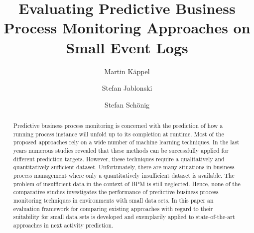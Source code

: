 \documentclass[runningheads]{llncs}
\begin{document}
%
\title{Evaluating Predictive Business Process Monitoring Approaches on Small Event Logs}
%
%
\author{Martin Käppel \and Stefan Jablonski
\and Stefan Schönig}

%
%
\maketitle              %
%
\vspace{-18pt}
\begin{abstract}
Predictive business process monitoring is concerned with the prediction of how a running process instance will unfold up to its completion at runtime. Most of the proposed approaches rely on a wide number of machine learning techniques. In the last years numerous studies revealed that these methods can be successfully applied for different prediction targets. However, these techniques require a qualitatively and quantitatively sufficient dataset. Unfortunately, there are many situations in business process management where only a quantitatively insufficient dataset is available. The problem of insufficient data in the context of BPM is still neglected. Hence, none of the comparative studies investigates the performance of predictive business process monitoring techniques in environments with small data sets. In this paper an evaluation framework for comparing existing approaches with regard to their suitability for small data sets is developed and exemplarily applied to state-of-the-art approaches in next activity prediction. 

\end{abstract}
\raggedbottom
\end{document}
